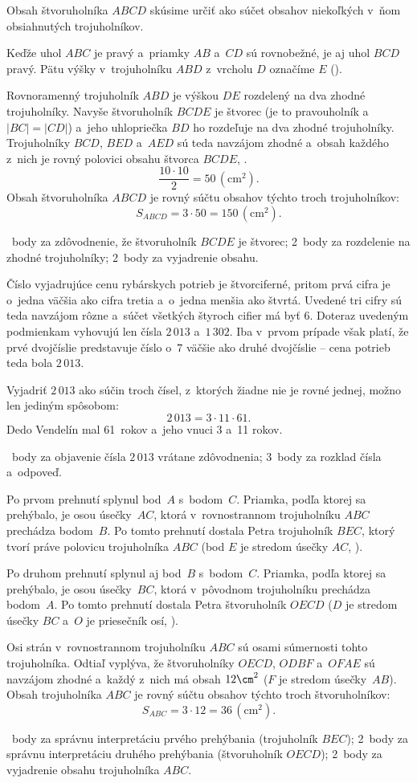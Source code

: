 {%
Obsah štvoruholníka $ABCD$ skúsime určiť ako súčet obsahov niekoľkých v~ňom
obsiahnutých trojuholníkov.

Keďže uhol $ABC$ je pravý a~priamky $AB$ a~$CD$ sú rovnobežné, je aj
uhol $BCD$ pravý.
Pätu výšky v~trojuholníku $ABD$ z~vrcholu $D$ označíme $E$ (\obr).
%

Rovnoramenný trojuholník $ABD$ je výškou $DE$ rozdelený na dva zhodné
trojuholníky.
Navyše štvoruholník $BCDE$ je štvorec (je to pravouholník a~$|BC|=|CD|$)
a~jeho uhlopriečka $BD$ ho rozdeľuje na dva zhodné trojuholníky.
Trojuholníky $BCD$, $BED$ a~$AED$ sú teda navzájom zhodné a~obsah každého
z~nich je rovný polovici obsahu štvorca $BCDE$, \tj.
$$
\frac{10\cdot10}2=50\,(\text{cm}^2).
$$
Obsah štvoruholníka $ABCD$ je rovný súčtu obsahov týchto troch trojuholníkov:
$$
S_{ABCD}=3\cdot50=150\,(\text{cm}^2).
$$

~body za zdôvodnenie, že štvoruholník $BCDE$ je štvorec;
2~body za rozdelenie na zhodné trojuholníky;
2~body za vyjadrenie obsahu.
\endhodnotenie
}

{%
Číslo vyjadrujúce cenu rybárskych potrieb je štvorciferné,
pritom prvá cifra je o~jedna väčšia ako cifra tretia a~o~jedna menšia ako
štvrtá.
Uvedené tri cifry sú teda navzájom rôzne a~súčet všetkých štyroch cifier má
byť $6$.
Doteraz uvedeným podmienkam vyhovujú len čísla $2\,013$ a~$1\,302$.
Iba v~prvom prípade však platí, že prvé dvojčíslie predstavuje číslo
o~$7$ väčšie ako druhé dvojčíslie -- cena potrieb teda bola $2\,013$.

Vyjadriť $2\,013$ ako súčin troch čísel, z~ktorých žiadne nie je rovné jednej, možno
len jediným spôsobom:
$$
2\,013=3\cdot11\cdot61.
$$
Dedo Vendelín mal 61~rokov a~jeho vnuci 3 a~11 rokov.

~body za objavenie čísla $2\,013$ vrátane zdôvodnenia;
3~body za rozklad čísla a~odpoveď.
\endhodnotenie
}

{%
Po prvom prehnutí splynul bod~$A$ s~bodom~$C$.
Priamka, podľa ktorej sa prehýbalo, je osou úsečky~$AC$,
ktorá v~rovnostrannom trojuholníku $ABC$ prechádza bodom~$B$.
Po tomto prehnutí dostala Petra trojuholník $BEC$, ktorý tvorí práve polovicu
trojuholníka $ABC$ (bod $E$ je stredom úsečky $AC$, \obr).
%

Po druhom prehnutí splynul aj bod~$B$ s~bodom~$C$.
Priamka, podľa ktorej sa prehýbalo, je osou úsečky~$BC$,
ktorá v~pôvodnom trojuholníku prechádza bodom~$A$.
Po tomto prehnutí dostala Petra štvoruholník $OECD$
($D$ je stredom úsečky $BC$ a~$O$ je priesečník osí, \obr).
%

Osi strán v~rovnostrannom trojuholníku $ABC$
sú osami súmernosti tohto trojuholníka.
Odtiaľ vyplýva, že štvoruholníky $OECD$, $ODBF$ a~$OFAE$ sú navzájom zhodné
a~každý z~nich má obsah $12\cm^2$ ($F$ je stredom úsečky~$AB$).
Obsah trojuholníka $ABC$ je rovný súčtu obsahov týchto troch štvoruholníkov:
$$
S_{ABC}=3\cdot12=36\,(\text{cm}^2).
$$

~body za správnu interpretáciu prvého prehýbania (trojuholník $BEC$);
2~body za správnu interpretáciu druhého prehýbania (štvoruholník $OECD$);
2~body za vyjadrenie obsahu trojuholníka $ABC$.
\endhodnotenie
}

